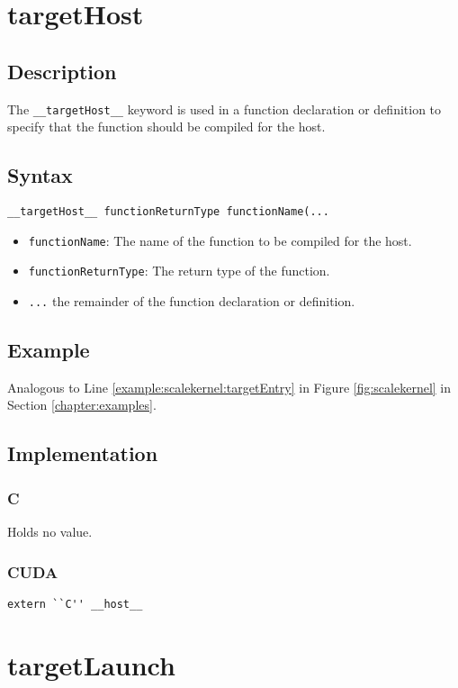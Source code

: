 \newpage
\section{targetHost}
\subsection{Description}

The \verb+__targetHost__+ keyword is used in a function declaration
or definition to specify that the function should be compiled for the
host.

\subsection{Syntax}
\begin{verbatim}
__targetHost__ functionReturnType functionName(...
\end{verbatim}

\begin{itemize}
\item \verb+functionName+: The name of the function to be compiled for the host.
\item \verb+functionReturnType+: The return type of the function.
\item \verb+...+ the remainder of the function declaration or definition.
\end{itemize}


\subsection{Example}
Analogous to Line \ref{example:scalekernel:targetEntry} in Figure \ref{fig:scalekernel} in Section \ref{chapter:examples}.

\subsection{Implementation}
\subsubsection{C}
Holds no value.
\subsubsection{CUDA}
\verb+extern ``C'' __host__+



\newpage
\section{targetLaunch}

